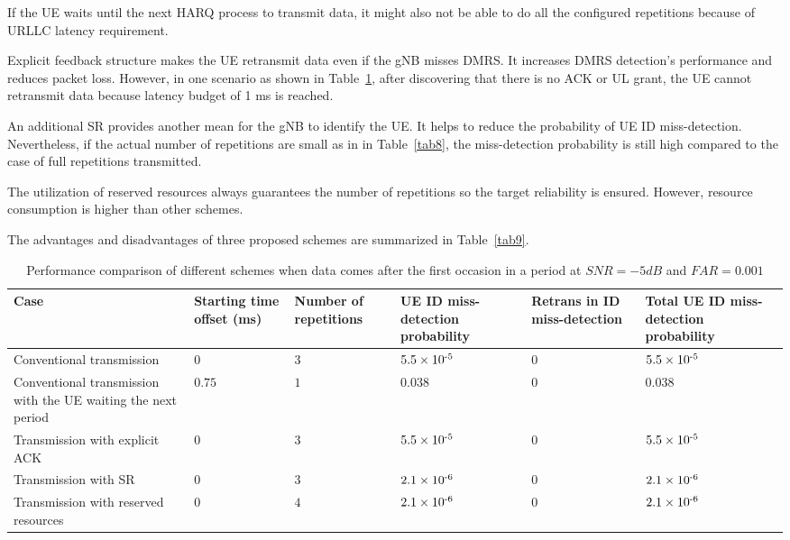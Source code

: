\documentclass{ieeeaccess}
\begin{document}
If the UE waits until the next HARQ process to transmit data, it might also not be able to do all the configured repetitions because of URLLC latency requirement.

Explicit feedback structure makes the UE retransmit data even if the gNB misses DMRS. It increases DMRS detection's performance and reduces packet loss. However, in one scenario as shown in Table~\ref{tab6}, after discovering that there is no ACK or UL grant, the UE cannot retransmit data because latency budget of 1 ms is reached.

An additional SR provides another mean for the gNB to identify the UE. It helps to reduce the probability of UE ID miss-detection. Nevertheless, if the actual number of repetitions are small as in in Table~\ref{tab8}, the miss-detection probability is still high compared to the case of full repetitions transmitted.

The utilization of reserved resources always guarantees the number of repetitions so the target reliability is ensured. However, resource consumption is higher than other schemes.

The advantages and disadvantages of three proposed schemes are summarized in Table~\ref{tab9}.

\begin{table}[htbp]
\caption{Performance comparison of different schemes when data comes after the first occasion in a period at $SNR = -5dB$ and $FAR = 0.001$}
\begin{center}
\begin{tabular}{|p{6em}|p{3em}|p{3em}|p{3.2em}|p{3.2em}|p{3.2em}|}
 \hline
 \textbf{Case} & \textbf{Starting time offset (ms)}&\textbf{Number of repetitions}&\textbf{UE ID miss-detection probability}&\textbf{Retrans in ID miss-detection}&\textbf{Total UE ID miss-detection probability}\\
 \hline
 Conventional transmission&$0$&$3$&$5.5\times10\textsuperscript{-5}$&$0$&$5.5\times10\textsuperscript{-5}$\\
 \hline
 Conventional transmission with the UE waiting the next period&$0.75$&$1$&$0.038$&$0$&$0.038$\\
 \hline
Transmission with explicit ACK&$0$&$3$&$5.5\times10\textsuperscript{-5}$&$0$&$5.5\times10\textsuperscript{-5}$\\
\hline
Transmission with SR&$0$&$3$&$2.1\times10\textsuperscript{-6}$&$0$&$2.1\times10\textsuperscript{-6}$\\
 \hline
Transmission with reserved resources&$0$&$4$&$2.1\times10\textsuperscript{-6}$&$0$&$2.1\times10\textsuperscript{-6}$\\
 \hline
\end{tabular}
\label{tab6}
\end{center}

\end{table}
\end{document}

